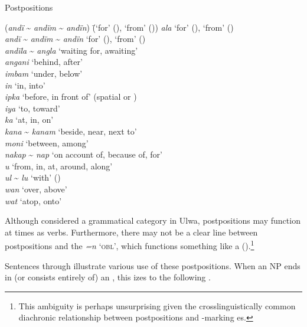 \ea%
    \label{ex:otherwc:1}
            Postpositions
\begin{tabbing}
{(\textit{andï} {\textasciitilde} \textit{andïm} {\textasciitilde} \textit{andïn})} \= {(‘for’ (), ‘from’ ())}\kill
    \textit{ala}  \>          ‘for’ (), ‘from’ ()\\
    \textit{andï} {\textasciitilde} \textit{andïm} {\textasciitilde} \textit{andïn} \> ‘for’ (), ‘from’ ()\\
    \textit{andïla} {\textasciitilde} \textit{angla}   \>   ‘waiting for, awaiting’\\
    \textit{angani}   \>       ‘behind, after’\\
    \textit{imbam}   \>       ‘under, below’\\
    \textit{in}    \>        ‘in, into’\\
    \textit{ipka}    \>      ‘before, in front of’ (spatial or )\\
    \textit{iya}   \>         ‘to, toward’\\
    \textit{ka}   \>         ‘at, in, on’\\
    \textit{kana} {\textasciitilde} \textit{kanam}  \>    ‘beside, near, next to’\\
    \textit{moni}   \>       ‘between, among’\\
    \textit{nakap} {\textasciitilde} \textit{nap}   \>   ‘on account of, because of, for’\\
    \textit{u}   \>         ‘from, in, at, around, along’\\
    \textit{ul} {\textasciitilde} \textit{lu}   \>       ‘with’ ()\\
    \textit{wan}   \>       ‘over, above’\\
    \textit{wat}   \>         ‘atop, onto’
\end{tabbing}
\z

Although considered a grammatical category in Ulwa, postpositions may function at times as verbs. Furthermore, there may not be a clear line between postpositions and the   \textit{=n} ‘\textsc{obl}’, which functions something like a  ().\footnote{This ambiguity is perhaps unsurprising given the crosslinguistically common diachronic relationship between postpositions and -marking es.} 

Sentences  through  illustrate various use of these postpositions. When an NP ends in (or consists entirely of) an , this  izes to the following .

